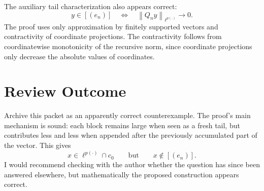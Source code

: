 ﻿\documentclass[11pt]{article}
\newcommand{\norm}[1]{\left\|#1\right\|}
\begin{document}
The auxiliary tail characterization also appears correct:
\[
  y\in[(e_n)]
  \quad\Longleftrightarrow\quad
  \norm{Q_ny}_{\ell^{p(\cdot)}}\to0.
\]
The proof uses only approximation by finitely supported vectors and contractivity of coordinate projections. The contractivity follows from coordinatewise monotonicity of the recursive norm, since coordinate projections only decrease the absolute values of coordinates.

\section*{Review Outcome}

Archive this packet as an apparently correct counterexample. The proof's main mechanism is sound: each block remains large when seen as a fresh tail, but contributes less and less when appended after the previously accumulated part of the vector. This gives
\[
  x\in\ell^{p(\cdot)}\cap c_0
  \qquad\text{but}\qquad
  x\notin[(e_n)].
\]
I would recommend checking with the author whether the question has since been answered elsewhere, but mathematically the proposed construction appears correct.
\end{document}
